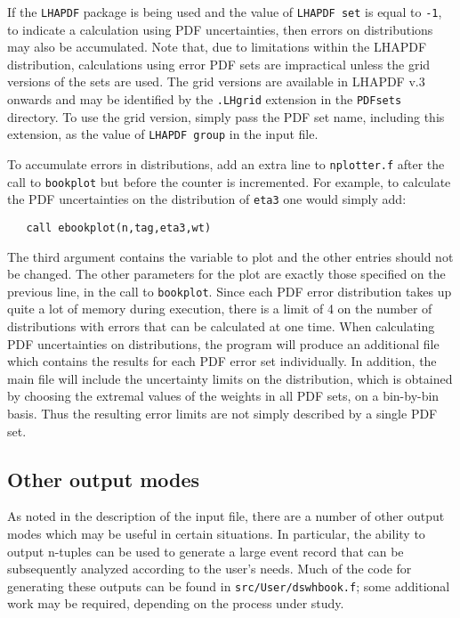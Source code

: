 \documentclass[12pt]{article}
\begin{document}
If the {\tt LHAPDF} package is being used and the value of
{\tt LHAPDF set} is equal to {\tt -1},  to indicate a calculation using
PDF uncertainties, then errors on distributions may also be accumulated.
Note that, due to limitations within the LHAPDF distribution, calculations
using error PDF sets are impractical unless the grid versions of the sets
are used. The grid versions are available in LHAPDF v.3 onwards and may be identified
by the {\tt .LHgrid} extension in the {\tt PDFsets} directory. To use the
grid version, simply pass the PDF set name, including this extension, as
the value of {\tt LHAPDF group} in the input file.
 
To accumulate errors in distributions, add an extra
line to {\tt nplotter.f} after the
call to {\tt bookplot} but before the counter is incremented. For
example, to calculate the PDF uncertainties on the distribution
of {\tt eta3} one would simply add:
\begin{verbatim}
   call ebookplot(n,tag,eta3,wt)
\end{verbatim}
The third argument contains the variable to plot and the other entries
should not be changed. The other parameters for the plot are exactly
those specified on the previous line, in the call to {\tt bookplot}.
Since each PDF error distribution takes up quite a lot of memory
during execution, there is a limit of 4 on the number of distributions
with errors that can be calculated at one time. When calculating
PDF uncertainties on distributions, the program will produce an
additional file which contains the results for each PDF error set
individually. In addition, the main file will include the uncertainty
limits on the distribution, which is obtained by choosing the extremal
values of the weights in all PDF sets, on a bin-by-bin basis. Thus
the resulting error limits are not simply described by a single PDF
set.

\subsection{Other output modes}
\label{subsec:otheroutput}
As noted in the description of the input file, there are a number of other
output modes which may be useful in certain situations. In particular, the
ability to output n-tuples can be used to generate a large event record that 
can be subsequently analyzed according to the user's needs. Much of the code
for generating these outputs can be found in {\tt src/User/dswhbook.f}; some
additional work may be required, depending on the process under study.
\end{document}

